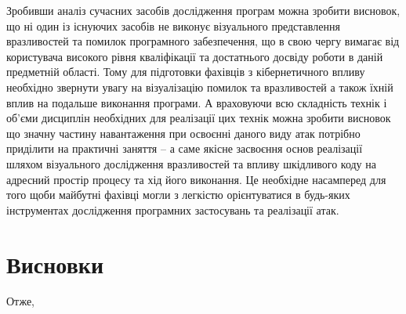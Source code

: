 Зробивши аналіз сучасних засобів дослідження програм можна зробити висновок, що ні один із існуючих засобів не виконує візуального представлення вразливостей та помилок програмного забезпечення, що в свою чергу вимагає від користувача високого рівня кваліфікації та достатнього досвіду роботи в даній предметній області.
Тому для підготовки фахівців з кібернетичного впливу необхідно звернути увагу на візуалізацію помилок та вразливостей а також їхній вплив на подальше виконання програми.  А враховуючи всю складність технік і об’єми дисциплін необхідних для реалізації цих технік можна зробити висновок що значну частину навантаження при освоєнні даного виду атак потрібно приділити на практичні заняття – а саме якісне засвоєння основ реалізації шляхом візуального дослідження вразливостей та впливу шкідливого коду на адресний простір процесу та хід його виконання. Це необхідне насамперед для  того щоби майбутні фахівці могли з легкістю орієнтуватися в будь-яких інструментах дослідження програмних застосувань та реалізації атак.

\section*{Висновки}
Отже,
